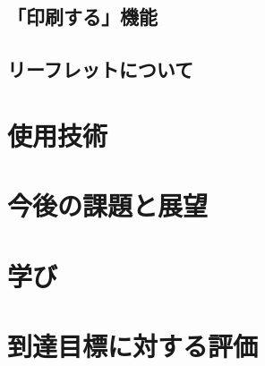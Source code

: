 \documentclass[openany,11pt,papersize]{jsbook}
\begin{document}
\section{「印刷する」機能}

\section{リーフレットについて}


\chapter{使用技術}







\chapter{今後の課題と展望}



\chapter{学び}





\chapter{到達目標に対する評価}

\end{document}
